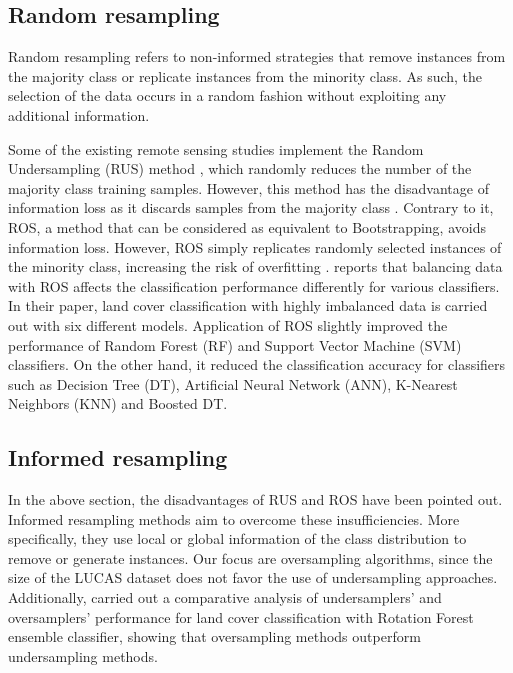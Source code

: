 \documentclass[remotesensing,article,submit,moreauthors,pdftex]{Definitions/mdpi}
\begin{document}
\subsection{Random resampling}

Random resampling refers to non-informed strategies that remove instances from
the majority class or replicate instances from the minority class. As such, the
selection of the data occurs in a random fashion without exploiting any
additional information.

Some of the existing remote sensing studies implement the Random Undersampling
(RUS) method \cite{Azadbakht2016}, which randomly reduces the number of the
majority class training samples. However, this method has the disadvantage of
information loss as it discards samples from the majority class
\cite{Feng2019}. Contrary to it, ROS, a method that can be considered as
equivalent to Bootstrapping, avoids information loss. However, ROS simply
replicates randomly selected instances of the minority class, increasing the
risk of overfitting \cite{Krawczyk2016}. \cite{Maxwell2018} reports that
balancing data with ROS affects the classification performance differently for
various classifiers. In their paper, land cover classification with highly
imbalanced data is carried out with six different models. Application of ROS
slightly improved the performance of Random Forest (RF) and Support Vector
Machine (SVM) classifiers. On the other hand, it reduced the classification
accuracy for classifiers such as Decision Tree (DT), Artificial Neural Network
(ANN), K-Nearest Neighbors (KNN) and Boosted DT.

\subsection{Informed resampling}

In the above section, the disadvantages of RUS and ROS have been pointed out.
Informed resampling methods aim to overcome these insufficiencies. More
specifically, they use local or global information of the class distribution to
remove or generate instances. Our focus are oversampling algorithms, since the
size of the LUCAS dataset does not favor the use of undersampling approaches.
Additionally, \cite{Feng2018} carried out a comparative analysis of
undersamplers' and oversamplers' performance for land cover classification with
Rotation Forest ensemble classifier, showing that oversampling methods
outperform undersampling methods.
\end{document}
